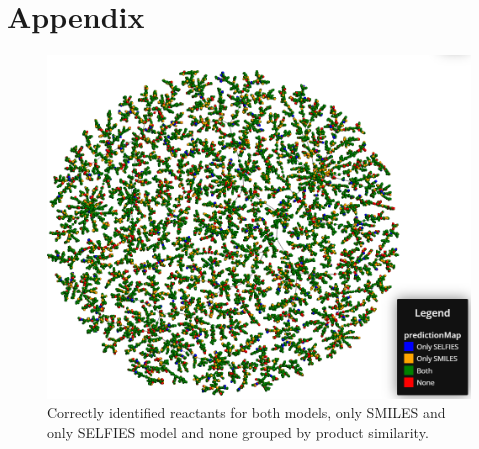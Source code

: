 \documentclass[10pt,conference,compsocconf]{IEEEtran}
\begin{document}
\newpage



\section{Appendix}
\begin{figure}[t]
    \centering
    \includegraphics[width = .9\textwidth]{./figures/tree.png}
    \caption{Correctly identified reactants for both models, only SMILES and only SELFIES model and none grouped by product similarity.}
    \label{fig:tree}
\end{figure} 
\end{document}
